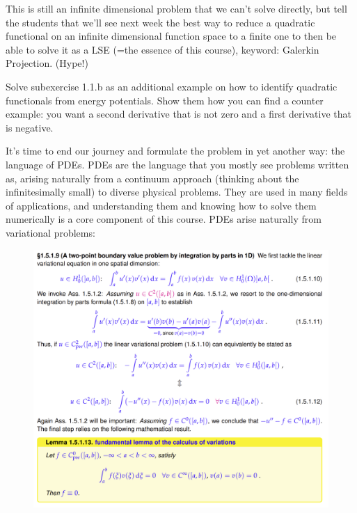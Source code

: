 This is still an infinite dimensional problem that we can't solve directly, but tell the students that we'll see next week the best way to reduce a quadratic functional on an infinite dimensional function space to a finite one to then be able to solve it as a LSE (=the essence of this course), keyword: Galerkin Projection. (Hype!)




Solve subexercise 1.1.b as an additional example on how to identify quadratic functionals from energy potentials. Show them how you can find a counter example: you want a second derivative that is not zero and a first derivative that is negative.



It's time to end our journey and formulate the problem in yet another way: the language of PDEs. PDEs are the language that you mostly see problems written as, arising naturally from a continuum approach (thinking about the infinitesimally small) to diverse physical problems. They are used in many fields of applications, and understanding them and knowing how to solve them numerically is a core component of this course. 
PDEs arise naturally from variational problems:

\begin{figure}[h]
\includegraphics[]{week02/lvp_to_pde.png}
\end{figure}

